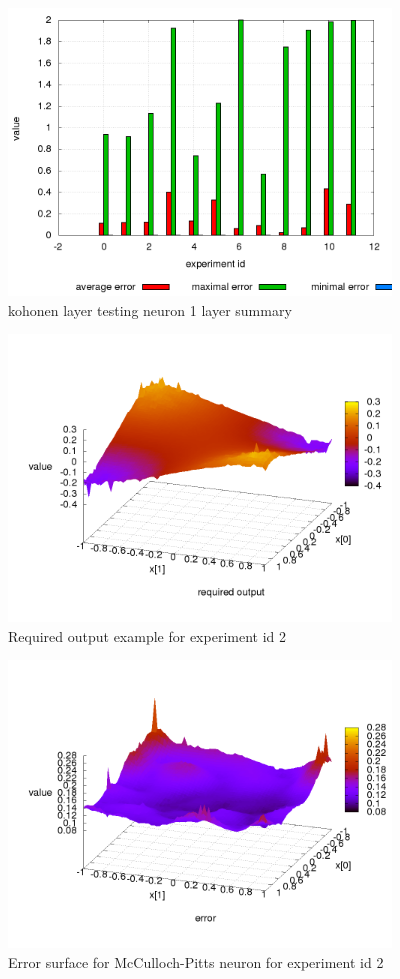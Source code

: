 \documentclass[times]{cpeauth}
\begin{document}
\begin{figure}[!ht]
\centering
\includegraphics[width=4.0in]{images/kohonen_layer_testing_neuron_1_layer_summary_result_log.png}
\caption{kohonen layer testing neuron 1 layer summary}
\label{img:kohonen_layer_testing_neuron_1_layer_summary}
\end{figure}

\begin{figure}[!ht]
\centering
\includegraphics[width=4.0in]{images/result_log_required_output.png}
\caption{Required output example for experiment id 2}
\label{img:NN required output example for experiment id 2}
\end{figure}

\begin{figure}[!ht]
\centering
\includegraphics[width=4.0in]{images/mcculloch_pitts_tanh_neuron_1_layer_result_log_output_error.png}
\caption{Error surface for McCulloch-Pitts neuron for experiment id 2}
\label{img:NN error example 02}
\end{figure}
\end{document}
